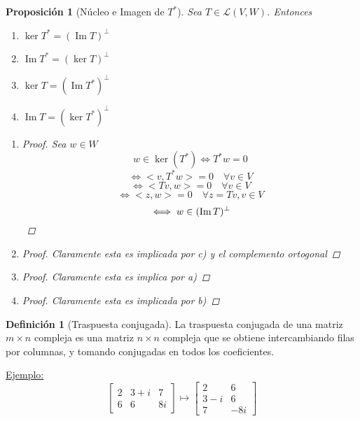 \documentclass[11pt]{book}
\DeclareMathOperator{\Ima}{Im}
\newtheorem{prop}[thm]{Proposición}
\theoremstyle{definition}
\newtheorem{defn}{Definición}[section]
\begin{document}
\begin{prop}[Núcleo e Imagen de $T^*$]
	Sea $T\in\mathcal{L}(V,W)$. Entonces
	\begin{enumerate}[label=\alph*)]
		\item $\ker T^*=(\Ima T)^\perp$

		\item $\Ima T^*=(\ker T)^\perp$

		\item $\ker T=(\Ima T^*)^\perp$

		\item $\Ima T=(\ker T^*)^\perp$
	\end{enumerate}
	\begin{enumerate}[label=\alph*)]
		\item \begin{proof}
			Sea $w\in W$
			\[w\in\ker (T^*)\iff T^*w=0\]
			\[\iff <v,T^*w>=0\quad\forall v\in V\]
			\[\iff <Tv,w>=0\quad\forall v\in V\]
			\[\iff <z,w>=0\quad\forall z=Tv,v\in V\]
			\[\iff w\in(\Ima T)^\perp\qedhere\]
		\end{proof}

		\item \begin{proof}
			Claramente esta es implicada por c) y el complemento ortogonal
		\end{proof}

		\item \begin{proof}
			Claramente esta es implica por a)
		\end{proof}

		\item \begin{proof}
			Claramente esta es implicada por b)
		\end{proof}
	\end{enumerate}
\end{prop}
\begin{defn}[Traspuesta conjugada]
	La traspuesta conjugada de una matriz $m\times n$ compleja es una matriz $n\times n$ compleja que se obtiene intercambiando filas por columnas, y tomando conjugadas en todos los coeficientes.
\end{defn}
\underline{Ejemplo:}
\[\begin{bmatrix}
	2 & 3+i & 7\\
	6 & 6 & 8i
\end{bmatrix}\mapsto\begin{bmatrix}
	2 & 6\\
	3-i & 6\\
	7 & -8i
\end{bmatrix}\]
\end{document}
